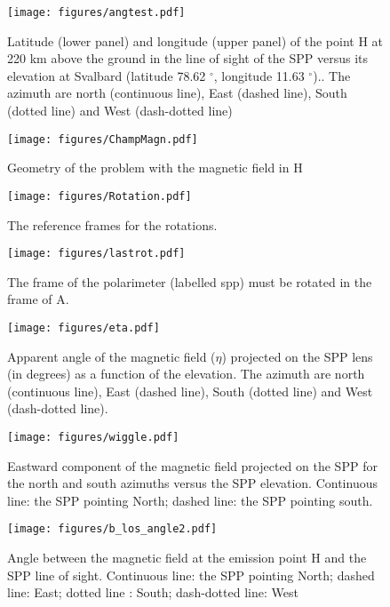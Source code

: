 \documentclass[draft,jgrga]{agutexSI}
\begin{document}
  \begin{figure}
   \noindent\texttt{[image: figures/angtest.pdf]}
   \caption{Latitude (lower panel) and longitude (upper panel) of the point H at 220 km above the ground in the line of sight of the SPP versus its elevation at Svalbard (latitude 78.62 $^\circ$, longitude 11.63 $^\circ$).. The azimuth are north (continuous line), East (dashed line), South (dotted line) and West (dash-dotted line) } 
   \label{angtest}
   \end{figure}

  \begin{figure}
   \noindent\texttt{[image: figures/ChampMagn.pdf]}
   \caption{Geometry of the problem with the magnetic field in H} 
   \label{ChampMagn}
   \end{figure}
   
  \begin{figure}
   \noindent\texttt{[image: figures/Rotation.pdf]}
   \caption{The reference frames for the rotations.} 
   \label{rotation}
   \end{figure}
 
   \begin{figure}
    \noindent\texttt{[image: figures/lastrot.pdf]}
   \caption{The frame of the polarimeter (labelled spp) must be rotated in the frame of A.} 
   \label{lastrot}
   \end{figure}

\begin{figure}
  \noindent\texttt{[image: figures/eta.pdf]}
     \caption{Apparent angle of the magnetic field ($\eta$) projected on the SPP lens (in degrees) as a function of the elevation. The azimuth are north (continuous line), East (dashed line), South (dotted line) and West (dash-dotted line).} 
   \label{fig_eta}
\end{figure}

   \begin{figure}
    \noindent\texttt{[image: figures/wiggle.pdf]}
   \caption{Eastward component of the magnetic field projected on the SPP for the north and south azimuths versus the SPP elevation. Continuous line: the SPP pointing North; dashed line: the SPP pointing south.} 
   \label{wriggle}
   \end{figure}

   \begin{figure}
    \noindent\texttt{[image: figures/b\_los\_angle2.pdf]}
   \caption{Angle between the magnetic field at the emission point H and the SPP line of sight. Continuous line: the SPP pointing North; dashed line: East; dotted line : South; dash-dotted line: West} 
   \label{fig_theta}
   \end{figure}
\end{document}
